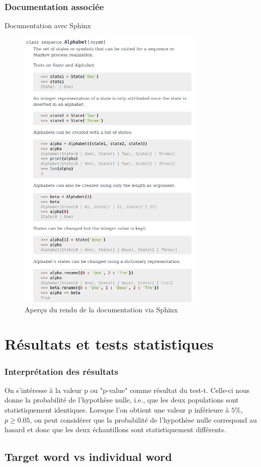 \documentclass{beamer}
\begin{document}
\begin{frame}
\frametitle{Documentation associée}
Documentation avec Sphinx
\begin{figure}[!ht]
    \centering
    \includegraphics[width=9cm]{Alphabet.png}
    \caption{Aperçu du rendu de la documentation via Sphinx}
    \label{fig5.3}
\end{figure}
\end{frame}

\section{Résultats et tests statistiques}

\begin{frame}
\frametitle{Interprétation des résultats}
On s'intéresse à la valeur p ou "p-value" comme résultat du test-t. Celle-ci nous donne la probabilité de l'hypothèse nulle, i.e., que les deux populations sont statistiquement identiques. Lorsque l'on obtient une valeur p inférieure à $5\%$, $p\geq 0.05$, on peut considérer que la probabilité de l'hypothèse nulle correspond au hasard et donc que les deux échantillons sont statistiquement différents.
\end{frame}

\subsection{Target word vs individual word}
\end{document}
